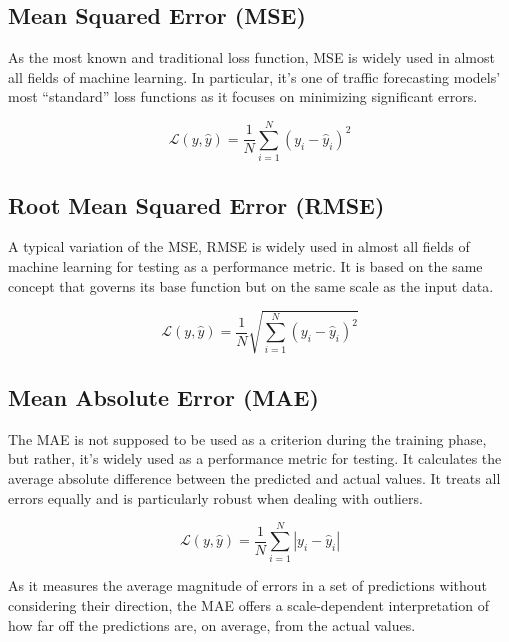 \subsection{Mean Squared Error (MSE)}

As the most known and traditional loss function, \gls{MSE} is widely used in almost all fields of machine learning. In particular, it's one of traffic forecasting models' most ``standard'' loss functions as it focuses on minimizing significant errors.

\begin{equation}
\mathcal{L}(y, \hat{y}) = \frac{1}{N} \sum_{i=1}^{N} (y_i - \hat{y}_i)^2
\end{equation}


\subsection{Root Mean Squared Error (RMSE)}

A typical variation of the \gls{MSE}, \gls{RMSE} is widely used in almost all fields of machine learning for testing as a performance metric. It is based on the same concept that governs its base function but on the same scale as the input data. 

\begin{equation}
 \mathcal{L}(y, \hat{y}) = \frac{1}{N} \sqrt{\sum_{i=1}^{N} (y_i - \hat{y}_i)^2}
\end{equation}

\subsection{Mean Absolute Error (MAE)}

The \gls{MAE} is not supposed to be used as a criterion during the training phase, but rather, it's widely used as a performance metric for testing. It calculates the average absolute difference between the predicted and actual values. It treats all errors equally and is particularly robust when dealing with outliers.

\begin{equation}
\mathcal{L}(y, \hat{y}) = \frac{1}{N} \sum_{i=1}^{N} |y_i - \hat{y}_i|
\end{equation}

As it measures the average magnitude of errors in a set of predictions without considering their direction, the \gls{MAE} offers a scale-dependent interpretation of how far off the predictions are, on average, from the actual values.

